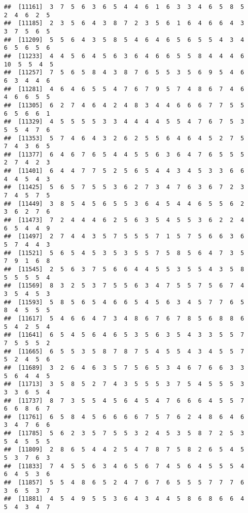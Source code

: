 \documentclass[
]{book}
\begin{document}
\begin{verbatim}
##  [11161]  3  7  5  6  3  6  5  4  4  6  1  6  3  3  4  6  5  8  5  2  4  6  2  5
##  [11185]  2  3  5  6  4  3  8  7  2  3  5  6  1  6  4  6  6  4  3  3  7  5  6  5
##  [11209]  5  5  6  4  3  5  8  5  4  6  4  6  5  6  5  5  4  3  4  6  5  6  5  6
##  [11233]  4  4  5  6  4  5  6  3  6  4  6  6  5  5  8  4  4  4  6 10  5  5  4  5
##  [11257]  7  5  6  5  8  4  3  8  7  6  5  5  3  5  6  9  5  4  6  6  3  4  4  6
##  [11281]  4  6  4  6  5  5  4  7  6  7  9  5  7  4  8  6  7  4  6  4  6  6  5  5
##  [11305]  6  2  7  4  6  4  2  4  8  3  4  4  6  6  6  7  7  5  5  6  5  6  6  1
##  [11329]  4  5  5  5  5  3  3  4  4  4  4  5  5  4  7  6  7  5  3  5  5  4  7  6
##  [11353]  5  7  4  6  4  3  2  6  2  5  5  6  4  6  4  5  2  7  5  7  4  3  6  5
##  [11377]  6  4  6  7  6  5  4  4  5  5  6  3  6  4  7  6  5  5  5  2  7  4  2  3
##  [11401]  6  4  4  7  7  5  2  5  6  5  4  4  3  4  5  3  3  6  6  4  4  5  4  3
##  [11425]  5  6  5  7  5  5  3  6  2  7  3  4  7  6  3  6  7  2  3  7  4  5  7  5
##  [11449]  3  8  5  4  5  6  5  5  3  6  4  5  4  4  6  5  5  6  2  3  6  2  7  6
##  [11473]  7  2  4  4  4  6  2  5  6  3  5  4  5  5  3  6  2  2  4  6  5  4  4  9
##  [11497]  2  7  4  4  3  5  7  5  5  5  7  1  5  7  5  6  6  3  6  5  7  4  4  3
##  [11521]  5  6  5  4  5  3  5  3  5  5  7  5  8  5  6  4  7  3  5  7  9  1  6  8
##  [11545]  2  5  6  3  7  5  6  6  4  4  5  5  3  5  5  4  3  5  8  5  5  5  5  4
##  [11569]  8  3  2  5  3  7  5  5  6  3  4  7  5  5  7  5  6  7  4  3  5  4  5  3
##  [11593]  5  8  5  6  5  4  6  6  5  4  5  6  3  4  5  7  7  6  5  8  4  5  5  5
##  [11617]  5  4  6  6  4  7  3  4  8  6  7  6  7  8  5  6  8  8  6  5  4  2  5  4
##  [11641]  6  5  4  5  6  4  6  5  3  5  6  3  5  4  3  3  5  5  7  7  5  5  5  2
##  [11665]  6  5  5  3  5  8  7  8  7  5  4  5  5  4  3  4  5  5  7  5  2  4  5  6
##  [11689]  3  2  6  4  6  3  5  7  5  6  5  3  4  6  7  6  6  3  3  5  6  4  4  5
##  [11713]  3  5  8  5  2  7  4  3  5  5  5  3  7  5  4  5  5  5  3  3  3  6  5  4
##  [11737]  8  7  3  5  5  4  5  6  4  5  4  7  6  6  6  4  5  5  7  6  6  8  6  7
##  [11761]  6  5  8  4  5  6  6  6  6  7  5  7  6  2  4  8  6  4  6  3  4  7  6  6
##  [11785]  5  6  2  3  5  7  5  5  3  2  4  5  3  5  8  7  2  5  3  5  4  5  5  5
##  [11809]  2  8  6  5  4  4  2  5  4  7  8  7  5  8  2  6  5  4  5  5  3  7  6  3
##  [11833]  7  4  5  5  6  3  4  6  5  6  7  4  5  6  4  5  5  5  4  6  4  5  3  6
##  [11857]  5  5  4  8  6  5  2  4  7  6  7  6  5  5  5  7  7  7  6  3  6  5  3  7
##  [11881]  4  5  4  9  5  5  3  6  4  3  4  4  5  8  6  8  6  6  4  5  4  3  4  7

\end{verbatim}
\end{document}

